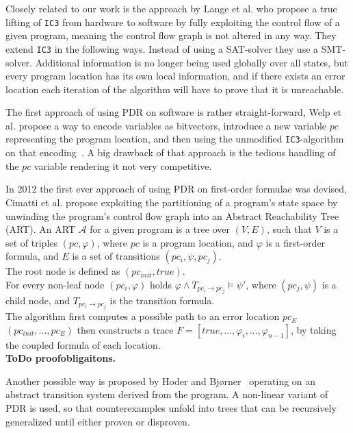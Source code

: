 \documentclass[11pt, a4paper, BCOR=10mm, ngerman]{scrbook}
\begin{document}
Closely related to our work is the approach by Lange et al. \cite{DBLP:conf/fmcad/0001NN15} who propose a true lifting of \texttt{IC3} from hardware to software by fully exploiting the control flow of a given program, meaning the control flow graph is not altered in any way. They extend \texttt{IC3} in the following ways. Instead of using a SAT-solver they use a SMT-solver. Additional information is no longer being used globally over all states, but every program location has its own local information, and if there exists an error location each iteration of the algorithm will have to prove that it is unreachable. \par

The first approach of using PDR on software is rather straight-forward, Welp et al. propose a way to encode variables as bitvectors, introduce a new variable $pc$ representing the program location, and then using the unmodified \texttt{IC3}-algorithm on that encoding~\cite{DBLP:conf/date/WelpK13}. A big drawback of that approach is the tedious handling of the $pc$ variable rendering it not very competitive.

In 2012 the first ever approach of using PDR on first-order formulae was devised, Cimatti et al. \cite{DBLP:conf/cav/CimattiG12} propose exploiting the partitioning of a program's state space by unwinding the program's control flow graph into an Abstract Reachability Tree (ART). An ART $\mathcal{A}$ for a given program is a tree over $(V, E)$, such that $V$ is a set of triples $(pc, \varphi)$, where $pc$ is a program location, and $\varphi$ is a first-order formula, and $E$ is a set of transitions $(pc_i, \psi, pc_j)$. \\
The root node is defined as $(pc_{init}, true)$. \\ For every non-leaf node $(pc_i, \varphi)$ holds $\varphi \land T_{pc_i \rightarrow pc_j} \models \psi'$, where $(pc_j, \psi)$ is a child node, and $T_{pc_i \rightarrow pc_j}$ is the transition formula. \\
The algorithm first computes a possible path to an error location $pc_E$ $(pc_{init}, ..., pc_E)$ then constructs a trace $F = [ true, ..., \varphi_i, ..., \varphi_{n-1} ] $, by taking the coupled formula of each location. \\
\textbf{ToDo proofobligaitons.}

Another possible way is proposed by Hoder and Bj{\o}rner~\cite{DBLP:conf/sat/HoderB12} operating on an abstract transition system derived from the program. A non-linear variant of PDR is used, so that counterexamples unfold into trees that can be recursively generalized until either proven or disproven.
\end{document}
